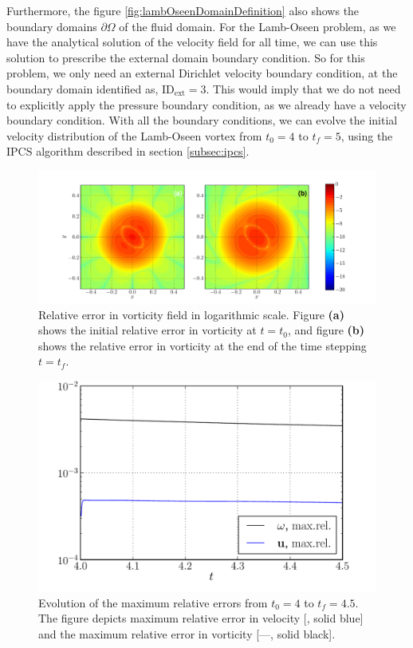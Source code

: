 Furthermore, the figure \ref{fig:lambOseenDomainDefinition} also shows the boundary domains $\partial \Omega$ of the fluid domain. For the Lamb-Oseen problem, as we have the analytical solution of the velocity field for all time, we can use this solution to prescribe the external domain boundary condition. So for this problem, we only need an external Dirichlet velocity boundary condition, at the boundary domain identified as, $\mathrm{ID}_{\mathrm{ext}} = 3$. This would imply that we do not need to explicitly apply the pressure boundary condition, as we already have a velocity boundary condition. With all the boundary conditions, we can evolve the initial velocity distribution of the Lamb-Oseen vortex from $t_0 = 4$ to $t_f =5$, using the IPCS algorithm described in section \ref{subsec:ipcs}. 

	\begin{figure}[p]
	\centering
	\includegraphics[width=0.99\linewidth]{./figures/eulerian/lambOseen_eulerian_wRelField_compressed.pdf}
	\caption{Relative error in vorticity field in logarithmic scale. Figure \textbf{(a)} shows the initial relative error in vorticity at $t=t_0$, and figure \textbf{(b)} shows the relative error in vorticity at the end of the time stepping $t=t_f$.}
	\label{fig:lambOseen_eulerian_wRelField_compressed}
	\end{figure}
	
	\begin{figure}[p]
	\centering
	\includegraphics[width=0.6\linewidth]{./figures/eulerian/lambOseen_eulerian_wRelEvolution_compressed.pdf}
	\caption{Evolution of the maximum relative errors from $t_0=4$ to $t_f=4.5$. The figure depicts maximum relative error in velocity [{\color{plotBlue}{---}}, solid blue] and the maximum relative error in vorticity [---, solid black].}
	\label{fig:lambOseen_eulerian_wRelEvolution}
	\end{figure}

